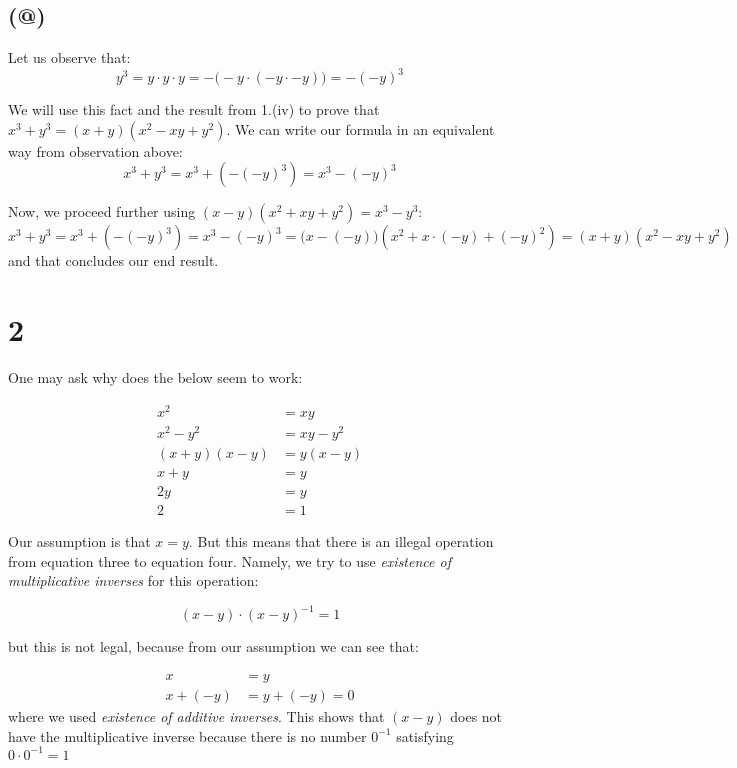 \documentclass{article}
\makeatletter
\newcommand*{\rom}[1]{\expandafter\@slowromancap\romannumeral #1@}
\makeatother
\begin{document}
\subsection*{(\rom{6})}

Let us observe that:
\begin{equation*}
	y^{3} = y \cdot y \cdot y = -\Big(-y \cdot (-y \cdot -y)\Big) = -(-y)^{3}
\end{equation*}

We will use this fact and the result from 1.(iv) to prove that \(x^3 + y^3 = (x+y)(x^2 -xy + y^2)\). We can write our formula
in an equivalent way from observation above:
\begin{equation*}
	x^3 + y^3 = x^3 + (-(-y)^{3}) = x^3 - (-y)^{3}
\end{equation*}

Now, we proceed further using \((x-y)(x^2 + xy + y^2) = x^3 - y^3\):
\begin{equation*}
	x^3 + y^3 = x^3 + (-(-y)^{3}) = x^3 - (-y)^{3} = \Big(x-(-y)\Big)(x^2 + x \cdot (-y) + (-y)^2) = (x+y)(x^{2} - xy + y^{2})
\end{equation*}
and that concludes our end result. 


\section*{2}

One may ask why does the below seem to work:

\begin{align*}
	x^{2} &=  xy\\
	x^{2} - y^{2} &=  xy - y^{2}\\
	(x+y)(x-y) &=  y(x - y)\\
	x + y &=  y\\
	2y &=  y\\
	2 &=  1
\end{align*}

Our assumption is that \(x = y\). But this means that there is an illegal operation from equation three to equation four. Namely, 
we try to use \emph{existence of multiplicative inverses} for this operation:

\begin{equation*}
	(x-y) \cdot (x-y)^{-1} = 1
\end{equation*}

but this is not legal, because from our assumption we can see that:

\begin{align*}
	x &= y \\
	x + (-y) &= y + (-y) = 0
\end{align*}
where we used \emph{existence of additive inverses}. This shows that \((x-y)\) does not have the multiplicative inverse because there is
no number \(0^{-1}\) satisfying \(0 \cdot 0^{-1} = 1\)
 
\end{document}

